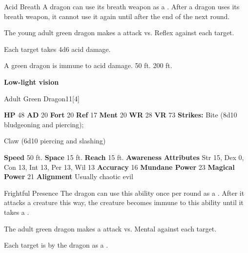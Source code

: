     \begin{freeability}{Acid Breath}
      A dragon can use its breath weapon as a .
      After a dragon uses its breath weapon, it cannot use it again until after the end of the next round.
      \par The young adult green dragon makes a  attack
        vs. Reflex against each target.
    
    \hit Each target takes 4d6 acid damage.
    \end{freeability}
  
      
       A green dragon is immune to acid damage.
     50 ft.
     200 ft.
    \par\noindent\textbf{Low-light vision}
  

  \begin{monsubsection}{Adult Green Dragon}{11}[4]
    \vspace{-1em}\vspace{-1em}
    \vspace{0em}

    
    

    \begin{spellcontent}
      \begin{spelltargetinginfo}
        \pari \textbf{HP} 48 \monsep
          \textbf{AD} 20 \monsep
          \textbf{Fort} 20 \monsep
          \textbf{Ref} 17 \monsep
          \textbf{Ment} 20
        \pari \textbf{WR} 28 \monsep
        \textbf{VR} 73
        \pari \textbf{Strikes:}
            Bite  (8d10 bludgeoning and piercing);
\par Claw  (6d10 piercing and slashing)
      \end{spelltargetinginfo}
    \end{spellcontent}
    \begin{monsterfooter}
      \pari \textbf{Speed} 50 ft. \monsep
        \textbf{Space} 15 ft. \monsep
        \textbf{Reach} 15 ft.
      \pari \textbf{Awareness} 
      \pari \textbf{Attributes}
        Str 15, Dex 0,
        Con 13, Int 13,
        Per 13, Wil 13
      \pari \textbf{Accuracy} 16 \monsep
        \textbf{Mundane Power} 23 \monsep
      \textbf{Magical Power} 21
      \pari \textbf{Alignment} Usually chaotic evil
    \end{monsterfooter}
  \end{monsubsection}
  \begin{freeability}{Frightful Presence}
      The dragon can use this ability once per round as a .
      After it attacks a creature this way, the creature becomes immune to this ability until it takes a .
      \par The adult green dragon makes a  attack
        vs. Mental against each target.
    
    \hit Each target is  by the dragon as a .
    \end{freeability}
  

